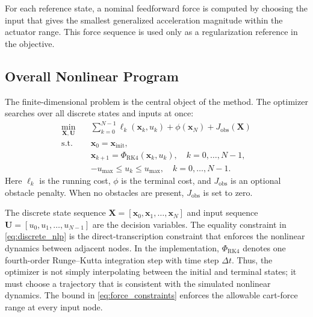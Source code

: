 \documentclass[conference]{IEEEtran}
\begin{document}
For each reference state, a nominal feedforward force is computed by choosing the input that gives the smallest generalized acceleration magnitude within the actuator range. This force sequence is used only as a regularization reference in the objective.

\subsection{Overall Nonlinear Program}
The finite-dimensional problem is the central object of the method. The optimizer searches over all discrete states and inputs at once:
\begin{align}
\min_{\bm{X},\bm{U}} \quad &
\sum_{k=0}^{N-1}\ell_k(\bm{x}_k,u_k)
+
\phi(\bm{x}_N)
+
J_{\mathrm{obs}}(\bm{X})
\label{eq:discrete_nlp}\\
\text{s.t.}\quad &
\bm{x}_0=\bm{x}_{\mathrm{init}},\\
& \bm{x}_{k+1}=\Phi_{\mathrm{RK4}}(\bm{x}_k,u_k),
\quad k=0,\ldots,N-1,\\
& -u_{\max}\leq u_k\leq u_{\max},
\quad k=0,\ldots,N-1 .
\label{eq:force_constraints}
\end{align}
Here $\ell_k$ is the running cost, $\phi$ is the terminal cost, and $J_{\mathrm{obs}}$ is an optional obstacle penalty. When no obstacles are present, $J_{\mathrm{obs}}$ is set to zero.

The discrete state sequence $\bm{X}=[\bm{x}_0,\bm{x}_1,\ldots,\bm{x}_N]$ and input sequence $\bm{U}=[u_0,u_1,\ldots,u_{N-1}]$ are the decision variables. The equality constraint in \eqref{eq:discrete_nlp} is the direct-transcription constraint that enforces the nonlinear dynamics between adjacent nodes. In the implementation, $\Phi_{\mathrm{RK4}}$ denotes one fourth-order Runge--Kutta integration step with time step $\Delta t$. Thus, the optimizer is not simply interpolating between the initial and terminal states; it must choose a trajectory that is consistent with the simulated nonlinear dynamics. The bound in \eqref{eq:force_constraints} enforces the allowable cart-force range at every input node.
\end{document}

